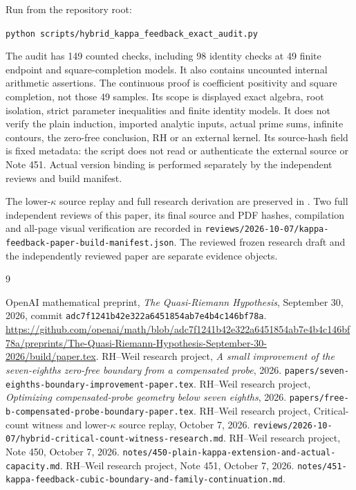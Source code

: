 \documentclass[11pt,a4paper]{article}
\theoremstyle{definition}
\newcommand{\src}[1]{\nolinkurl{#1}}
\begin{document}
Run from the repository root:
\begin{center}
 \texttt{python}\ \src{scripts/hybrid_kappa_feedback_exact_audit.py}
\end{center}
The audit has 149 counted checks, including 98 identity checks
at 49 finite endpoint and square-completion models. It also
contains uncounted internal arithmetic assertions. The continuous proof
is coefficient positivity and square completion, not those
49 samples. Its scope is displayed exact algebra, root isolation,
strict parameter inequalities and finite identity models.
It does not verify the plain induction, imported analytic
inputs, actual prime sums, infinite contours, the zero-free
conclusion, RH or an external kernel. Its source-hash field is
fixed metadata: the script does not read or authenticate the external
source or Note 451. Actual version binding is performed separately
by the independent reviews and build manifest.

The lower-$\kappa$ source replay and full research derivation
are preserved in \cite{CountReplay,Note450,Note451}.
Two full independent reviews of this paper, its final source
and PDF hashes, compilation and all-page visual verification
are recorded in
\src{reviews/2026-10-07/kappa-feedback-paper-build-manifest.json}.
The reviewed frozen research draft and the independently
reviewed paper are separate evidence objects.

\clearpage
\begin{thebibliography}{9}
\raggedright
{}
OpenAI mathematical preprint,
\emph{The Quasi-Riemann Hypothesis}, September 30, 2026,
commit \src{adc7f1241b42e322a6451854ab7e4b4c146bf78a}.
\url{https://github.com/openai/math/blob/adc7f1241b42e322a6451854ab7e4b4c146bf78a/preprints/The-Quasi-Riemann-Hypothesis-September-30-2026/build/paper.tex}.
RH--Weil research project,
\emph{A small improvement of the seven-eighths zero-free boundary
from a compensated probe},
2026. \src{papers/seven-eighths-boundary-improvement-paper.tex}.
RH--Weil research project,
\emph{Optimizing compensated-probe geometry below seven eighths},
2026. \src{papers/free-b-compensated-probe-boundary-paper.tex}.
RH--Weil research project,
Critical-count witness and lower-$\kappa$ source replay, October 7, 2026.
\src{reviews/2026-10-07/hybrid-critical-count-witness-research.md}.
RH--Weil research project, Note 450, October 7, 2026.
\src{notes/450-plain-kappa-extension-and-actual-capacity.md}.
RH--Weil research project, Note 451, October 7, 2026.
\src{notes/451-kappa-feedback-cubic-boundary-and-family-continuation.md}.
\end{thebibliography}
\end{document}
